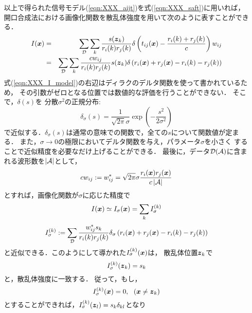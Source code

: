 以上で得られた信号モデル(\ref{eqn:XXX_aijt})を式(\ref{eqn:XXX_saft})に用いれば，
開口合成法における画像化関数を散乱体強度を用いて次のように表すことができる．
\begin{eqnarray}
	I(\mbox{\boldmath $x$})
	&=&
	\sum_{\cal D}
	\sum_{k}
	\frac{ s(\mbox{\boldmath $z$}_k)}{r_i(k)r_j(k)}
	\delta\left(t_{ij}(\mbox{\boldmath $x$})-\frac{r_i(k)+r_j(k)}{c}\right)  w_{ij}
	\\
	&=&
	\sum_{\cal D} \sum_{k}
	\frac{cw_{ij}}{r_i(k)r_j(k)} s(\mbox{\boldmath $z$}_k)
	\delta\left(r_i(\mbox{\boldmath $x$})+r_j(\mbox{\boldmath $x$})-r_i(k)-r_j(k)\right) 
	\label{eqn:XXX_I_model}
\end{eqnarray}
式(\ref{eqn:XXX_I_model})の右辺はディラクのデルタ関数を使って書かれているため，
その引数がゼロとなる位置では数値的な評価を行うことができない．
そこで，$\delta(s)$を 分散$\sigma^2$の正規分布:
\begin{equation}
	\delta_\sigma (s) = \frac{1}{ \sqrt{2\pi}\sigma } \exp\left( -\frac{s^2}{2\sigma^2}\right)
	\label{eqn:Gauss}
\end{equation}
で近似する．$\delta_\sigma(s)$は通常の意味での関数で，全ての$s$について関数値が定まる．
また，$\sigma\rightarrow 0$の極限においてデルタ関数を与え，パラメータ$\sigma$を小さく
することで近似精度を必要なだけ上げることができる．
最後に，データ$\cal D(A)$に含まれる波形数を$|{\cal A}|$として，
\begin{equation}
	c w_{ij}:=
	w_{ij}^*
	=
	\sqrt{2\pi}\sigma
	\frac{r_{i}(\mbox{\boldmath $x$})r_j(\mbox{\boldmath $x$})}{c\left| {\cal A}\right|}
	\label{eqn:XXX_wij_model}
\end{equation}
とすれば，画像化関数が$\sigma$に応じた精度で
\begin{equation}
	I(\mbox{\boldmath $x$})
		\simeq 
	I_\sigma(\mbox{\boldmath $x$})
		=
	\sum_{k} I_\sigma^{(k)}
	\label{eqn:XXX_saft_model}
\end{equation}
\begin{equation}
	I_\sigma^{(k)}
	:=
	\sum_{\cal D}
	\frac{w_{ij}^*s_k}{r_i(k)r_j(k)} 
	\delta_\sigma\left(r_i(\mbox{\boldmath $x$})+r_j(\mbox{\boldmath $x$})-r_i(k)-r_j(k)\right) 
	\label{eqn:eqn:XXX_Ikk_def}
\end{equation}
と近似できる．このようにして導かれた$I^{(k)}_\sigma(\mbox{\boldmath $x$})$は，
散乱体位置$\mbox{\boldmath $z$}_k$で
\begin{equation}
	I^{(k)}_\sigma(\mbox{\boldmath $z$}_k)=s_k
	\label{eqn:eqn:XXX_Ikk_z}
\end{equation}
と，散乱体強度に一致する．
従って，もし，
\begin{equation}
	I^{(k)}_\sigma(\fat{x})=0, \ \ (\fat{x}\neq \fat{z}_k)
	\label{eqn:XXX_Ikk_x}
\end{equation}
とすることができれば，$I^{(k)}_{\sigma}(\mbox{\boldmath $z$}_l)=s_k \delta_{kl}$となり
